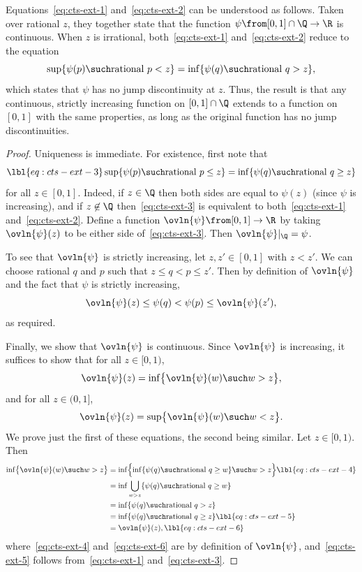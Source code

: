 Equations~\eqref{eq:cts-ext-1} and~\eqref{eq:cts-ext-2} can be understood
as follows.  Taken over rational $z$, they together state that the function
$\psi \from [0, 1] \cap \Q \to \R$ is continuous.  When $z$ is irrational,
both~\eqref{eq:cts-ext-1} and~\eqref{eq:cts-ext-2} reduce to the equation
\[
\sup \{ \psi(p) \such \text{rational } p < z \}
=
\inf \{ \psi(q) \such \text{rational } q > z \},
\]
which states that $\psi$ has no jump discontinuity at $z$.  Thus, the
result is that any continuous, strictly increasing
function on $[0, 1] \cap \Q$ extends to a function on $[0, 1]$ with
the same properties, as long as the original function has no jump
discontinuities. 

\begin{proof}
Uniqueness is immediate.  For existence, first note that
% 
\begin{equation}
\lbl{eq:cts-ext-3}
\sup \{ \psi(p) \such \text{rational } p \leq z\}
=
\inf \{ \psi(q) \such \text{rational } q \geq z\}
\end{equation}
% 
for all $z \in [0, 1]$.  Indeed, if $z \in \Q$ then both sides are equal to
$\psi(z)$ (since $\psi$ is increasing), and if $z \not\in \Q$
then~\eqref{eq:cts-ext-3} is equivalent to both~\eqref{eq:cts-ext-1}
and~\eqref{eq:cts-ext-2}.  Define a function $\ovln{\psi} \from [0, 1]
\to \R$ by taking $\ovln{\psi}(z)$ to be either side
of~\eqref{eq:cts-ext-3}.  Then $\ovln{\psi}|_{\Q} = \psi$.  

To see that $\ovln{\psi}$ is strictly increasing, let $z, z' \in [0, 1]$
with $z < z'$.  We can choose rational $q$ and $p$ such that $z \leq q < p
\leq z'$.  Then by definition of $\ovln{\psi}$ and the fact that $\psi$ is
strictly increasing, 
\[
\ovln{\psi}(z) \leq \psi(q) < \psi(p) \leq \ovln{\psi}(z'), 
\]
as required.

Finally, we show that $\ovln{\psi}$ is continuous.  Since $\ovln{\psi}$ is
increasing, it suffices to show that for all $z \in [0, 1)$,
\[
\ovln{\psi}(z) = \inf \bigl\{ \ovln{\psi}(w) \such w > z \bigr\},
\]
and for all $z \in (0, 1]$,
\[
\ovln{\psi}(z) = \sup \bigl\{ \ovln{\psi}(w) \such w < z \bigr\}.
\]
We prove just the first of these equations, the second being similar.  Let
$z \in [0, 1)$.  Then
% 
\begin{align}
\inf \bigl\{ \ovln{\psi}(w) \such w > z \bigr\}     &
=
\inf \Bigl\{ 
\inf \{ \psi(q) \such \text{rational } q \geq w \} 
\such w > z
\Bigr\} 
\lbl{eq:cts-ext-4}    \\
&
=
\inf \bigcup_{w > z} 
\{ \psi(q) \such \text{rational } q \geq w \}    
\nonumber       \\
&
=
\inf \{ \psi(q) \such \text{rational } q > z \}
\nonumber       \\
&
=
\inf \{ \psi(q) \such \text{rational } q \geq z \}
\lbl{eq:cts-ext-5}    \\
&
=
\ovln{\psi}(z),
\lbl{eq:cts-ext-6}
\end{align}
% 
where~\eqref{eq:cts-ext-4} and~\eqref{eq:cts-ext-6} are by definition of
$\ovln{\psi}$, and~\eqref{eq:cts-ext-5} follows from~\eqref{eq:cts-ext-1}
and~\eqref{eq:cts-ext-3}. 
\end{proof}


